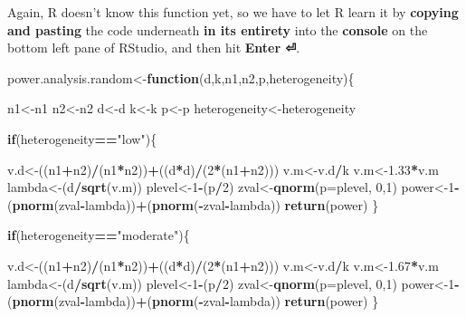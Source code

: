 \documentclass[]{book}
\newenvironment{Shaded}{\begin{snugshade}}{\end{snugshade}}
\newcommand{\KeywordTok}[1]{\textcolor[rgb]{0.13,0.29,0.53}{\textbf{#1}}}
\newcommand{\DataTypeTok}[1]{\textcolor[rgb]{0.13,0.29,0.53}{#1}}
\newcommand{\DecValTok}[1]{\textcolor[rgb]{0.00,0.00,0.81}{#1}}
\newcommand{\FloatTok}[1]{\textcolor[rgb]{0.00,0.00,0.81}{#1}}
\newcommand{\StringTok}[1]{\textcolor[rgb]{0.31,0.60,0.02}{#1}}
\newcommand{\ControlFlowTok}[1]{\textcolor[rgb]{0.13,0.29,0.53}{\textbf{#1}}}
\newcommand{\OperatorTok}[1]{\textcolor[rgb]{0.81,0.36,0.00}{\textbf{#1}}}
\newcommand{\NormalTok}[1]{#1}
\theoremstyle{definition}
\theoremstyle{definition}
\theoremstyle{definition}
\theoremstyle{remark}
\begin{document}
Again, R doesn't know this function yet, so we have to let R learn it by
\textbf{copying and pasting} the code underneath \textbf{in its
entirety} into the \textbf{console} on the bottom left pane of RStudio,
and then hit \textbf{Enter ⏎}.

\begin{Shaded}
\begin{Highlighting}[]
\NormalTok{power.analysis.random<-}\ControlFlowTok{function}\NormalTok{(d,k,n1,n2,p,heterogeneity)\{}

\NormalTok{  n1<-n1}
\NormalTok{  n2<-n2}
\NormalTok{  d<-d}
\NormalTok{  k<-k}
\NormalTok{  p<-p}
\NormalTok{  heterogeneity<-heterogeneity}
  
  \ControlFlowTok{if}\NormalTok{(heterogeneity}\OperatorTok{==}\StringTok{"low"}\NormalTok{)\{}

\NormalTok{  v.d<-((n1}\OperatorTok{+}\NormalTok{n2)}\OperatorTok{/}\NormalTok{(n1}\OperatorTok{*}\NormalTok{n2))}\OperatorTok{+}\NormalTok{((d}\OperatorTok{*}\NormalTok{d)}\OperatorTok{/}\NormalTok{(}\DecValTok{2}\OperatorTok{*}\NormalTok{(n1}\OperatorTok{+}\NormalTok{n2)))}
\NormalTok{  v.m<-v.d}\OperatorTok{/}\NormalTok{k}
\NormalTok{  v.m<-}\FloatTok{1.33}\OperatorTok{*}\NormalTok{v.m}
\NormalTok{  lambda<-(d}\OperatorTok{/}\KeywordTok{sqrt}\NormalTok{(v.m))}
\NormalTok{  plevel<-}\DecValTok{1}\OperatorTok{-}\NormalTok{(p}\OperatorTok{/}\DecValTok{2}\NormalTok{)}
\NormalTok{  zval<-}\KeywordTok{qnorm}\NormalTok{(}\DataTypeTok{p=}\NormalTok{plevel, }\DecValTok{0}\NormalTok{,}\DecValTok{1}\NormalTok{)}
\NormalTok{  power<-}\DecValTok{1}\OperatorTok{-}\NormalTok{(}\KeywordTok{pnorm}\NormalTok{(zval}\OperatorTok{-}\NormalTok{lambda))}\OperatorTok{+}\NormalTok{(}\KeywordTok{pnorm}\NormalTok{(}\OperatorTok{-}\NormalTok{zval}\OperatorTok{-}\NormalTok{lambda))}
  \KeywordTok{return}\NormalTok{(power)}
\NormalTok{  \}}
  
  \ControlFlowTok{if}\NormalTok{(heterogeneity}\OperatorTok{==}\StringTok{"moderate"}\NormalTok{)\{}
    
\NormalTok{      v.d<-((n1}\OperatorTok{+}\NormalTok{n2)}\OperatorTok{/}\NormalTok{(n1}\OperatorTok{*}\NormalTok{n2))}\OperatorTok{+}\NormalTok{((d}\OperatorTok{*}\NormalTok{d)}\OperatorTok{/}\NormalTok{(}\DecValTok{2}\OperatorTok{*}\NormalTok{(n1}\OperatorTok{+}\NormalTok{n2)))}
\NormalTok{  v.m<-v.d}\OperatorTok{/}\NormalTok{k}
\NormalTok{  v.m<-}\FloatTok{1.67}\OperatorTok{*}\NormalTok{v.m}
\NormalTok{  lambda<-(d}\OperatorTok{/}\KeywordTok{sqrt}\NormalTok{(v.m))}
\NormalTok{  plevel<-}\DecValTok{1}\OperatorTok{-}\NormalTok{(p}\OperatorTok{/}\DecValTok{2}\NormalTok{)}
\NormalTok{  zval<-}\KeywordTok{qnorm}\NormalTok{(}\DataTypeTok{p=}\NormalTok{plevel, }\DecValTok{0}\NormalTok{,}\DecValTok{1}\NormalTok{)}
\NormalTok{  power<-}\DecValTok{1}\OperatorTok{-}\NormalTok{(}\KeywordTok{pnorm}\NormalTok{(zval}\OperatorTok{-}\NormalTok{lambda))}\OperatorTok{+}\NormalTok{(}\KeywordTok{pnorm}\NormalTok{(}\OperatorTok{-}\NormalTok{zval}\OperatorTok{-}\NormalTok{lambda))}
  \KeywordTok{return}\NormalTok{(power)}
\NormalTok{  \}}
    

\end{Highlighting}
\end{Shaded}
\end{document}
